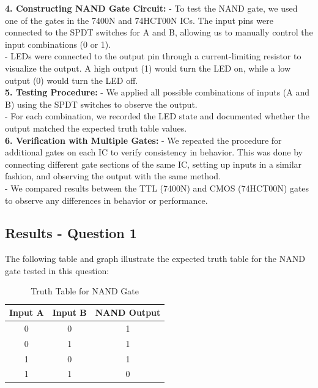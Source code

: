 \documentclass{article}
\begin{document}
    \textbf{4. Constructing NAND Gate Circuit:}
    - To test the NAND gate, we used one of the gates in the 7400N and 74HCT00N ICs. The input pins were connected to the SPDT switches for A and B, allowing us to manually control the input combinations (0 or 1).
    \\
    - LEDs were connected to the output pin through a current-limiting resistor to visualize the output. A high output (1) would turn the LED on, while a low output (0) would turn the LED off.
    \\

    \textbf{5. Testing Procedure:}
    - We applied all possible combinations of inputs (A and B) using the SPDT switches to observe the output.
    \\
    - For each combination, we recorded the LED state and documented whether the output matched the expected truth table values.
    \\

    \textbf{6. Verification with Multiple Gates:}
    - We repeated the procedure for additional gates on each IC to verify consistency in behavior. This was done by connecting different gate sections of the same IC, setting up inputs in a similar fashion, and observing the output with the same method.
    \\
    - We compared results between the TTL (7400N) and CMOS (74HCT00N) gates to observe any differences in behavior or performance.
    \\


    \subsection*{\textbf{Results - Question 1}}
    The following table and graph illustrate the expected truth table for the NAND gate tested in this question:

    \begin{table}[H]
        \centering
        \caption{Truth Table for NAND Gate}
        \begin{tabular}{|c|c|c|}
            \hline
            Input A & Input B & NAND Output \\
            \hline
            0 & 0 & 1 \\
            0 & 1 & 1 \\
            1 & 0 & 1 \\
            1 & 1 & 0 \\
            \hline
        \end{tabular}
    \end{table}
\end{document}
